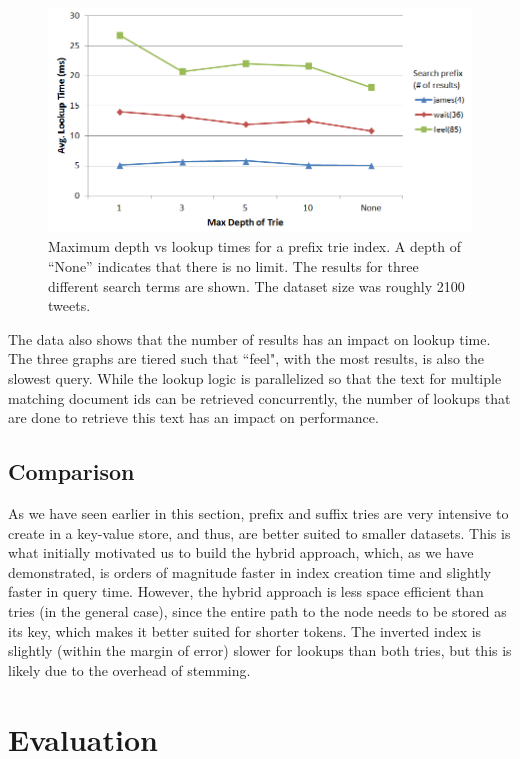 \documentclass{vldb}
\begin{document}
\begin{figure}[h!]
   \includegraphics[scale=.38]{trie_maxdepth_graph}
  \caption{Maximum depth vs lookup times for a prefix trie index. A depth of ``None'' indicates that there is no limit. The results for three different search terms are shown. The dataset size was roughly 2100 tweets.}
\label{comptrie}
\end{figure}

The data also shows that the number of results has an  impact on lookup time. The three graphs are tiered such that ``feel", with the most results, is also the slowest query. While the lookup logic is parallelized so that the text for multiple matching document ids can be retrieved concurrently, the number of lookups that are done to retrieve this text has an impact on performance.

\subsection{Comparison}

As we have seen earlier in this section, prefix and suffix tries are very intensive to create in a key-value store, and thus, are better suited to smaller datasets. This is what initially motivated us to build the hybrid approach, which, as we have demonstrated, is orders of magnitude faster in index creation time and slightly faster in query time. However, the hybrid approach is less space efficient than tries (in the general case), since the entire path to the node needs to be stored as its key, which makes it better suited for shorter tokens. The inverted index is slightly (within the margin of error) slower for lookups than both tries, but this is likely due to the overhead of stemming.

\section{Evaluation}
\end{document}
